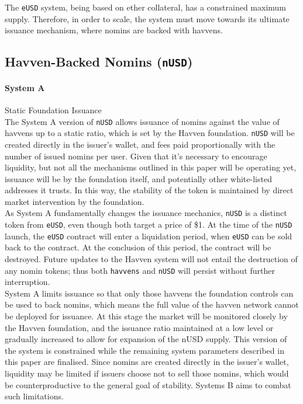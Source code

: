 \noindent The \texttt{eUSD} system, being based on ether collateral, has a constrained
maximum supply. Therefore, in order to scale, the system must move towards its ultimate
issuance mechanism, where nomins are backed with havvens.

\pagebreak
\subsection{Havven-Backed Nomins (\texttt{nUSD})}

\paragraph{System A} Static Foundation Issuance \\

\noindent The System A version of \texttt{nUSD} allows issuance of nomins against
the value of havvens up to a static ratio, which is set by the Havven foundation.
\texttt{nUSD} will be created directly in the issuer's wallet, and fees paid
proportionally with the number of issued nomins per user. Given that it's necessary to
encourage liquidity, but not all the mechanisms outlined in this paper will be operating
yet, issuance will be by the foundation itself, and potentially other white-listed
addresses it trusts. In this way, the stability of the token is maintained by direct
market intervention by the foundation. \\

\noindent As System A fundamentally changes the issuance mechanics, \texttt{nUSD} is a distinct
token from \texttt{eUSD}, even though both target a price of \$1. At the time of the \texttt{nUSD}
launch, the \texttt{eUSD} contract will enter a liquidation period, when \texttt{eUSD}
can be sold back to the contract. At the conclusion of this period, the contract will be destroyed.
Future updates to the Havven system will not entail the destruction of any nomin tokens;
thus both \texttt{havvens} and \texttt{nUSD} will persist without further interruption. \\

\noindent System A limits issuance so that only those havvens the foundation controls can be
used to back nomins, which means the full value of the havven network cannot be deployed for
issuance. At this stage the market will be monitored closely by the Havven foundation, 
and the issuance ratio maintained at a low level or gradually increased to allow for
expansion of the nUSD supply.
This version of the system is constrained while the remaining system parameters
described in this paper are finalised. Since nomins are created directly in
the issuer's wallet, liquidity may be limited if issuers choose not to sell those nomins,
which would be counterproductive to the general goal of stability. Systems B aims to
combat such limitations. \\



